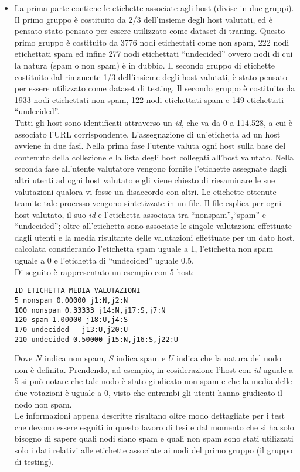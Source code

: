 \begin{itemize}
 \item La prima parte contiene le etichette associate agli host (divise in due gruppi). Il primo gruppo è costituito da 2/3 dell'insieme degli host valutati, ed è pensato stato pensato per essere utilizzato come dataset di traning. Questo primo gruppo è costituito da 3776 nodi etichettati come non spam, 222 nodi etichettati spam ed infine 277 nodi etichettati ``undecided'' ovvero nodi di cui la natura (spam o non spam) è in dubbio. Il secondo gruppo di etichette costituito dal rimanente 1/3 dell'insieme degli host valutati, è stato pensato per essere utilizzato come dataset di testing. Il secondo gruppo è costituito da 1933 nodi etichettati non spam, 122 nodi etichettati spam e 149 etichettati ``undecided''. \\ Tutti gli host sono identificati attraverso un \textit{id}, che va da 0 a 114.528, a cui è associato l'URL corrispondente.
 L'assegnazione di un'etichetta ad un host avviene in due fasi. Nella prima fase l'utente valuta ogni host sulla base del contenuto della collezione e la lista degli host collegati all'host valutato. Nella seconda fase all'utente valutatore vengono fornite l'etichette  assegnate dagli altri utenti ad ogni host valutato e gli viene chiesto di riesaminare le sue valutazioni qualora vi fosse un disaccordo con altri. Le etichette ottenute tramite tale processo vengono sintetizzate in un file. Il file esplica per ogni host valutato, il suo \textit{id}  e l'etichetta associata tra ``nonspam'',``spam'' e ``undecided''; oltre all'etichetta sono associate le singole valutazioni effettuate dagli utenti e la media risultante delle valutazioni effettuate per un dato host, calcolata considerando l'etichetta spam uguale a 1, l'etichetta non spam  uguale a 0 e l'etichetta di ``undecided'' uguale 0.5.\\
Di seguito è rappresentato un esempio con 5 host: 
 \begin{lstlisting}[frame=trbl,postbreak=\space, breakindent=5pt, breaklines]
ID ETICHETTA MEDIA VALUTAZIONI
5 nonspam 0.00000 j1:N,j2:N
100 nonspam 0.33333 j14:N,j17:S,j7:N
120 spam 1.00000 j18:U,j4:S
170 undecided - j13:U,j20:U
210 undecided 0.50000 j15:N,j16:S,j22:U
\end{lstlisting}
Dove \(N\) indica non spam, \(S\) indica spam e \(U\) indica che la natura del nodo non è definita. Prendendo, ad esempio, in cosiderazione l'host con \textit{id} uguale a 5 si può notare che tale nodo è stato giudicato non spam e che la media delle due votazioni è uguale a 0, visto che entrambi gli utenti hanno giudicato il nodo non spam.\\ 
Le informazioni appena descritte risultano oltre modo dettagliate per i test che devono essere esguiti in questo lavoro di tesi e dal momento che si ha solo bisogno di sapere quali nodi siano spam e quali non spam sono stati utilizzati solo i dati relativi alle etichette associate ai nodi del primo gruppo (il gruppo di testing).


\end{itemize}
